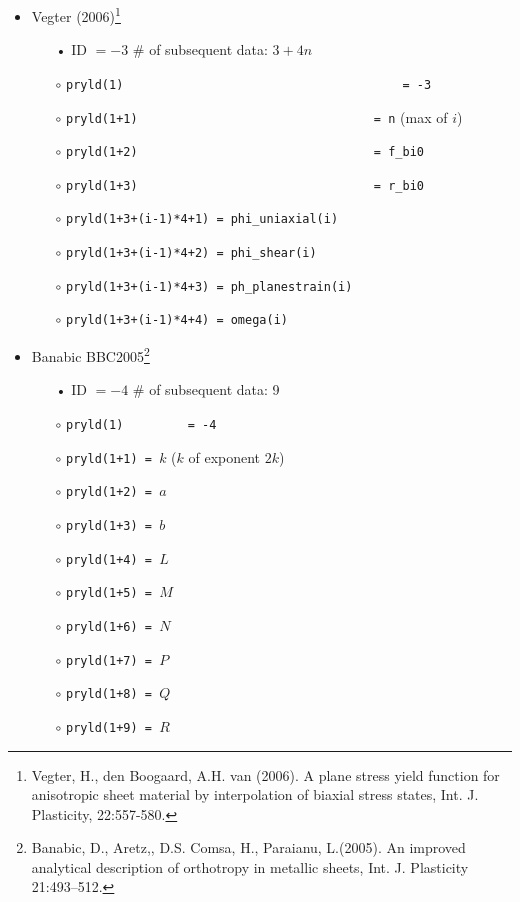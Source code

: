 \documentclass[11pt,a4paper,twoside,final,onecolumn,titlepage]{article}
\begin{document}
\begin{itemize}
	\item Vegter (2006)\footnote{Vegter, H., den Boogaard, A.H. van (2006). A plane stress yield function for anisotropic sheet material by interpolation of biaxial stress states, Int. J. Plasticity, 22:557-580.}
	\begin{itemize}
		\item[•] ID $= -3$ \hspace{98pt} \# of subsequent data: $3+4n$
		\item[$\circ$] \texttt{pryld(1)\,\,\,\,\,\,\,\,\,\,\,\,\,\,\,\,\,\,\,\,\,\,\,\,\,\,\,\,\,\,\,\,\,\,\,\,\,\,\,= -3}
		\item[$\circ$] \texttt{pryld(1+1)\,\,\,\,\,\,\,\,\,\,\,\,\,\,\,\,\,\,\,\,\,\,\,\,\,\,\,\,\,\,\,\,\,= n} (max of $i$)
		\item[$\circ$] \texttt{pryld(1+2)\,\,\,\,\,\,\,\,\,\,\,\,\,\,\,\,\,\,\,\,\,\,\,\,\,\,\,\,\,\,\,\,\,= f\_bi0}
		\item[$\circ$] \texttt{pryld(1+3)\,\,\,\,\,\,\,\,\,\,\,\,\,\,\,\,\,\,\,\,\,\,\,\,\,\,\,\,\,\,\,\,\,= r\_bi0}
		\item[$\circ$] \texttt{pryld(1+3+(i-1)*4+1) = phi\_uniaxial(i)}
		\item[$\circ$] \texttt{pryld(1+3+(i-1)*4+2) = phi\_shear(i)}
		\item[$\circ$] \texttt{pryld(1+3+(i-1)*4+3) = ph\_planestrain(i)}
		\item[$\circ$] \texttt{pryld(1+3+(i-1)*4+4) = omega(i)}\\
	\end{itemize}
\end{itemize}

\begin{itemize}
	\item Banabic BBC2005\footnote{Banabic, D., Aretz,, D.S. Comsa, H., Paraianu, L.(2005). An improved analytical description of orthotropy in metallic sheets, Int. J. Plasticity 21:493–512.}
	\begin{itemize}
		\item[•] ID $= -4$ \hspace{98pt} \# of subsequent data: 9
		\item[$\circ$] \texttt{pryld(1)\,\,\,\,\,\,\,\,\,= -4}
		\item[$\circ$] \texttt{pryld(1+1) = $k$} ($k$ of exponent $2k$)
		\item[$\circ$] \texttt{pryld(1+2) = $a$}
		\item[$\circ$] \texttt{pryld(1+3) = $b$}
		\item[$\circ$] \texttt{pryld(1+4) = $L$}
		\item[$\circ$] \texttt{pryld(1+5) = $M$}
		\item[$\circ$] \texttt{pryld(1+6) = $N$}
		\item[$\circ$] \texttt{pryld(1+7) = $P$}
		\item[$\circ$] \texttt{pryld(1+8) = $Q$}
		\item[$\circ$] \texttt{pryld(1+9) = $R$}\\
	\end{itemize}
\end{itemize}
\end{document}
